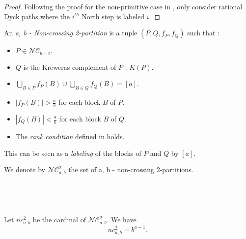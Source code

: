 \begin{proof}
    Following the proof for the non-primitive case in
    \cite{ref8}, only consider rational Dyck paths where the
    $i^{th}$ North step is labeled $i$.
\end{proof}

\begin{definition}
    An \emph{a, b - Non-crossing 2-partition} is
    a tuple $(P, Q, f_P, f_Q)$ such that :
    \begin{itemize}
        \item $P \in \mathcal{NC}_{b-1}$.
        \item $Q$ is the Kreweras complement of $P$ : $K(P)$.
        \item $\displaystyle \bigcup_{B \in P}{f_P(B)} \cup
                \bigcup_{B \in Q}{f_Q(B)} = [a]$.
        \item $|f_P(B)| > \frac{a}{b}$ for each block $B$
                of $P$.
        \item $|f_Q(B)| < \frac{a}{b}$ for each block $B$
                of $Q$.
        \item The \emph{rank condition} defined in
            \cite{ref8} holds.  
    \end{itemize}
\end{definition}

This can be seen as a \emph{labeling} of the blocks of
$P$ and $Q$ by $[a]$.

We denote by $\mathcal{NC}^2_{a,b}$ the set of 
a, b - non-crossing 2-partitions.

\begin{example}[$a > b : a = 7, b = 3$]
    ~\\
    \begin{center}
                
    \end{center}
\end{example}

\begin{example}[$a < b : a = 3, b = 5$]
    ~\\
    \begin{center}
                
    \end{center}
\end{example}

\begin{theorem}[Bodnar, 2017]
    Let $nc^2_{a,b}$ be the cardinal of $\mathcal{NC}^2_{a,b}$.
    We have $$nc^2_{a,b} = b^{a-1}.$$   
\end{theorem}

